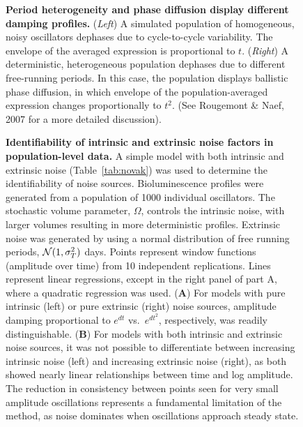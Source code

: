 \documentclass[11pt, letterpaper]{article}
\begin{document}
\begin{figure}[tbp]
  \begin{center}
  \end{center}
  \caption{{\bfseries Period heterogeneity and phase diffusion display different damping profiles.} ({\itshape Left}) A simulated population of homogeneous, noisy oscillators dephases due to cycle-to-cycle variability. The envelope of the averaged expression is proportional to $t$.
  ({\itshape Right}) A deterministic, heterogeneous population dephases due to different free-running periods. In this case, the population displays ballistic phase diffusion, in which envelope of the population-averaged expression changes proportionally to $t^2$. (See Rougemont \& Naef, 2007 \cite{Rougemont2007} for a more detailed discussion).}
  \label{fig:dephasing-rates}
\end{figure}

\begin{figure}[tbp]
  \begin{center}
  \end{center}
  \caption{{\bfseries Identifiability of intrinsic and extrinsic noise factors in population-level data.} A simple model with both intrinsic and extrinsic noise (Table~\ref{tab:novak}) was used to determine the identifiability of noise sources. Bioluminescence profiles were generated from a population of 1000 individual oscillators. The stochastic volume parameter, $\Omega$, controls the intrinsic noise, with larger volumes resulting in more deterministic profiles. Extrinsic noise was generated by using a normal distribution of free running periods, ${\cal N}(1, \sigma^2_T)$ days. Points represent window functions (amplitude over time) from 10 independent replications. Lines represent linear regressions, except in the right panel of part A, where a quadratic regression was used.
  ({\bfseries A}) For models with pure intrinsic (left) or pure extrinsic (right) noise sources, amplitude damping proportional to $e^{dt}$ vs.\ $e^{dt^2}$, respectively, was readily distinguishable. 
  ({\bfseries B}) For models with both intrinsic and extrinsic noise sources, it was not possible to differentiate between increasing intrinsic noise (left) and increasing extrinsic noise (right), as both showed nearly linear relationships between time and log amplitude.
  The reduction in consistency between points seen for very small amplitude oscillations represents a fundamental limitation of the method, as noise dominates when oscillations approach steady state.
}
  \label{fig:computational_dephasing}
\end{figure}
\end{document}

